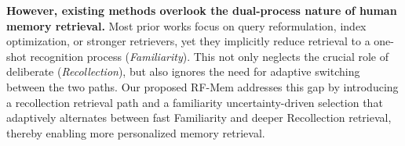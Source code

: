 \textbf{However, existing methods overlook the dual-process nature of human memory retrieval.}
Most prior works focus on query reformulation, index optimization, or stronger retrievers, yet they implicitly reduce retrieval to a one-shot recognition process (\emph{Familiarity}). This not only neglects the crucial role of deliberate (\emph{Recollection}), but also ignores the need for adaptive switching between the two paths. Our proposed RF-Mem addresses this gap by introducing a recollection retrieval path and a familiarity uncertainty-driven selection that adaptively alternates between fast Familiarity and deeper Recollection retrieval, thereby enabling more personalized memory retrieval.



